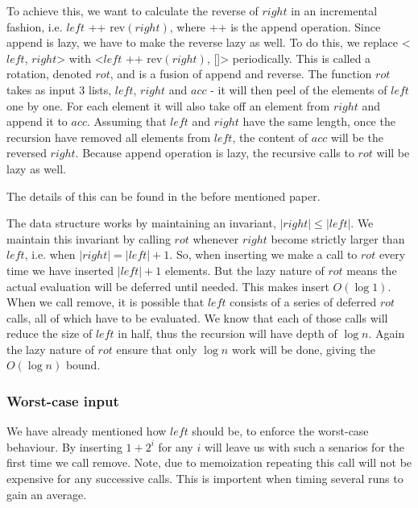 To achieve this, we want to calculate the reverse of $right$ in an incremental fashion, i.e. $left$ ++ rev$(right)$, where ++ is the append operation. Since append is lazy, we have to make the reverse lazy as well. To do this, we replace <$left$, $right$> with <$left$ ++ rev$(right)$, []> periodically. This is called a rotation, denoted $rot$, and is a fusion of append and reverse. The function $rot$ takes as input 3 lists, $left$, $right$ and $acc$ - it will then peel of the elements of $left$ one by one. For each element it will also take off an element from $right$ and append it to $acc$. Assuming that $left$ and $right$ have the same length, once the recursion have removed all elements from $left$, the content of $acc$ will be the reversed $right$. Because append operation is lazy, the recursive calls to $rot$ will be lazy as well.

The details of this can be found in the before mentioned paper.

The data structure works by maintaining an invariant, $|right| \leq |left|$. We maintain this invariant by calling $rot$ whenever $right$ become strictly larger than $left$, i.e. when $|right| = |left| + 1$. So, when inserting we make a call to $rot$ every time we have inserted $|left| +1$ elements. But the lazy nature of $rot$ means the actual evaluation will be deferred until needed. This makes insert $O(\log 1)$. When we call remove, it is possible that $left$ consists of a series of deferred $rot$ calls, all of which have to be evaluated. We know that each of those calls will reduce the size of $left$ in half, thus the recursion will have depth of $\log n$. Again the lazy nature of $rot$ ensure that only $\log n$ work will be done, giving the $O(\log n)$ bound.

\subsubsection{Worst-case input}
We have already mentioned how $left$ should be, to enforce the worst-case behaviour. By inserting $1 + 2^i$ for any $i$ will leave us with such a senarios for the first time we call remove. Note, due to memoization repeating this call will not be expensive for any successive calls. This is importent when timing several runs to gain an average.

